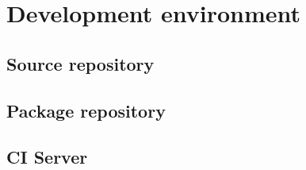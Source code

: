 \chapter{Development environment}

\section{Source repository}

\section{Package repository}

\section{CI Server}